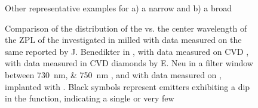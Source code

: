 	\begin{figure}[tp]
		\begin{subfigure}[t]{ 0.49\linewidth}
			\centering
			\caption{}
			\label{subfig::emnarrow2}
		\end{subfigure}
		\hfill
		\begin{subfigure}[t]{ 0.49\linewidth}
			\centering
			\caption{}
			\label{subfig::embroad2}
		\end{subfigure}
		\caption{Other representative examples for a) a narrow and b) a broad \ZPL}
		\label{fig::spectra2}
	\end{figure}

	\begin{figure}[tp]
		\centering
		\caption{Comparison of the distribution of the \lw vs. the center wavelength of the ZPL of the investigated \sivs in milled \nds with data measured on the same \nds reported by J. Benedikter in \cite{Benedikter2017a}, with data measured on CVD \nds, with data measured in CVD diamonds by E. Neu in a filter window between \SIlist{730; 750}{nm} \cite{Neu2012}, and with data measured on \implantedTao, implanted with \Si. Black symbols represent emitters exhibiting a dip in the \gtz function, indicating a single or very few \sivs}
		\label{fig::bimodal_distr_compare}
	\end{figure}

